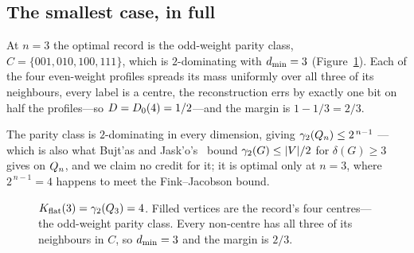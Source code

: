 \subsection{The smallest case, in full}

At $n = 3$ the optimal record is the odd-weight parity class,
$C = \{001, 010, 100, 111\}$, which is $2$-dominating with $d_{\min} = 3$
(Figure~\ref{fig:q3}). Each of the four even-weight profiles spreads its mass
uniformly over all three of its neighbours, every label is a centre, the
reconstruction errs by exactly one bit on half the profiles---so
$D = D_0(4) = 1/2$---and the margin is $1 - 1/3 = 2/3$.

The parity class is $2$-dominating in every dimension, giving
$\gamma_2(Q_n) \le 2^{\,n-1}$ --- which is also what Bujt'{a}s and
Jask'{o}'s~\cite{bujtasjasko} bound $\gamma_2(G) \le |V|/2$ for $\delta(G) \ge 3$
gives on $Q_n$, and we claim no credit for it; it is optimal only at $n = 3$, where
$2^{\,n-1} = 4$ happens to meet the Fink--Jacobson bound.

\begin{figure}[t]
\centering
{}
\caption{$K_{\mathrm{flat}}(3) = \gamma_2(Q_3) = 4$. Filled vertices are the record's four
centres---the odd-weight parity class. Every non-centre has all three of its
neighbours in $C$, so $d_{\min} = 3$ and the margin is $2/3$.}
\label{fig:q3}
\end{figure}

